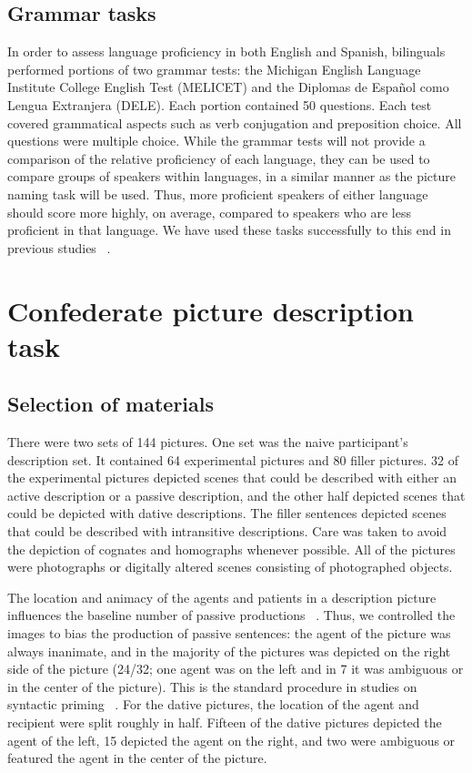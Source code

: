 \subsection{Grammar tasks}
\label{grammartasks}

In order to assess language proficiency in both English and Spanish, bilinguals performed portions of two grammar tests: the Michigan English Language Institute College English Test (MELICET) and the Diplomas de Espa\~{n}ol como Lengua Extranjera (DELE). Each portion contained 50 questions. Each test covered grammatical aspects such as verb conjugation and preposition choice. All questions were multiple choice. While the grammar tests will not provide a comparison of the relative proficiency of each language, they can be used to compare groups of speakers within languages, in a similar manner as the picture naming task will be used. Thus, more proficient speakers of either language should score more highly, on average, compared to speakers who are less proficient in that language. We have used these tasks successfully to this end in previous studies ~\citep[e.g.,][]{Gullifer2013}.

\section{Confederate picture description task}
\label{confederatepicturedescriptiontask}

\subsection{Selection of materials}
\label{selectionofmaterials}

There were two sets of 144 pictures. One set was the naive participant's description set. It contained 64 experimental pictures and 80 filler pictures. 32 of the experimental pictures depicted scenes that could be described with either an active description or a passive description, and the other half depicted scenes that could be depicted with dative descriptions. The filler sentences depicted scenes that could be described with intransitive descriptions. Care was taken to avoid the depiction of cognates and homographs whenever possible. All of the pictures were photographs or digitally altered scenes consisting of photographed objects. 

The location and animacy of the agents and patients in a description picture influences the baseline number of passive productions ~\citep[e.g.,][]{Bock1986, Hartsuiker1998}. Thus, we controlled the images to bias the production of passive sentences: the agent of the picture was always inanimate, and in the majority of the pictures was depicted on the right side of the picture (24\slash 32; one agent was on the left and in 7 it was ambiguous or in the center of the picture). This is the standard procedure in studies on syntactic priming ~\citep{Hartsuiker2004}. For the dative pictures, the location of the agent and recipient were split roughly in half. Fifteen of the dative pictures depicted the agent of the left, 15 depicted the agent on the right, and two were ambiguous or featured the agent in the center of the picture. 

